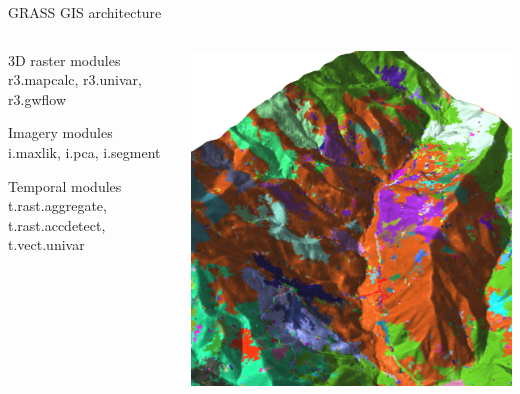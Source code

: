 \documentclass[xcolor={dvipsnames,usenames},beamer,aspectratio=169]{beamer}
\begin{document}
\begin{frame}{GRASS GIS architecture}

\begin{columns}
\begin{column}{0.4\textwidth}

\begin{block}{3D raster modules}
r3.mapcalc, r3.univar, r3.gwflow
\end{block}

\begin{block}{Imagery modules}
i.maxlik, i.pca, i.segment
\end{block}

\begin{block}{Temporal modules}
t.rast.aggregate, t.rast.accdetect, t.vect.univar
\end{block}

\end{column}
\begin{column}{0.45\textwidth}

\begin{center}
  \includegraphics[width=\textwidth]{grass/segment_on_counts}
\end{center}


\end{column}
\end{columns}

\end{frame}
\end{document}
